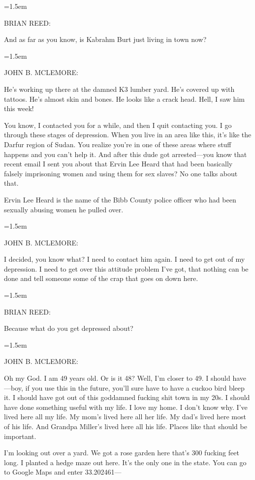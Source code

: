 \documentclass[10pt,a4paper]{article}
\newcommand{\speakerlabel}[1]{{\plantin\color{speakerblue}\MakeUppercase{#1}:}}
\newenvironment{speech}[1]{%
		\par\medskip
		\begin{list}{}{%
			\leftmargin=1.5em
			\rightmargin=0pt
			\topsep=0pt
			\partopsep=0pt
			\parsep=0.5\baselineskip
			\itemsep=0pt}%
		\item\speakerlabel{#1}\enspace\ignorespaces
	}{\end{list}}
\newenvironment{narration}[1]{%
		\par\medskip\noindent\speakerlabel{#1}\enspace\ignorespaces
	}{\par\medskip}
\begin{document}
\begin{speech}{BRIAN REED}
And as far as you know, is Kabrahm Burt just living in town now?
\end{speech}
\begin{speech}{JOHN B. McLEMORE}
He's working up there at the damned K3 lumber yard. He's covered up with tattoos. He's almost skin and bones. He looks like a crack head. Hell, I saw him this week!

You know, I contacted you for a while, and then I quit contacting you. I go through these stages of depression. When you live in an area like this, it's like the Darfur region of Sudan. You realize you're in one of these areas where stuff happens and you can't help it. And after this dude got arrested—you know that recent email I sent you about that Ervin Lee Heard that had been basically falsely imprisoning women and using them for sex slaves? No one talks about that.
\end{speech}
\begin{narration}{BRIAN REED}
Ervin Lee Heard is the name of the Bibb County police officer who had been sexually abusing women he pulled over.
\end{narration}
\begin{speech}{JOHN B. McLEMORE}
I decided, you know what? I need to contact him again. I need to get out of my depression. I need to get over this attitude problem I've got, that nothing can be done and tell someone some of the crap that goes on down here.
\end{speech}
\begin{speech}{BRIAN REED}
Because what do you get depressed about?
\end{speech}
\begin{speech}{JOHN B. McLEMORE}
Oh my God. I am 49 years old. Or is it 48? Well, I'm closer to 49. I should have—boy, if you use this in the future, you'll sure have to have a cuckoo bird bleep it. I should have got out of this goddamned fucking shit town in my 20s. I should have done something useful with my life. I love my home. I don't know why. I've lived here all my life. My mom's lived here all her life. My dad's lived here most of his life. And Grandpa Miller's lived here all his life. Places like that should be important.

I'm looking out over a yard. We got a rose garden here that's 300 fucking feet long. I planted a hedge maze out here. It's the only one in the state. You can go to Google Maps and enter 33.202461—
\end{speech}
\end{document}
